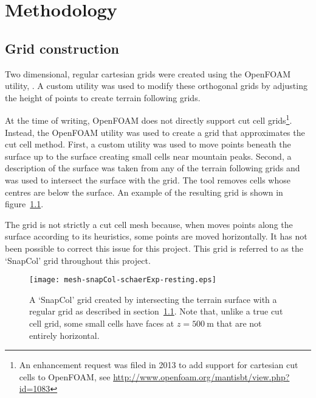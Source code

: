 \chapter{Methodology}

\section{Grid construction}
\label{sec:method:grid}

Two dimensional, regular cartesian grids were created using the OpenFOAM utility, .  A custom utility was used to modify these orthogonal grids by adjusting the height of points to create terrain following grids.

At the time of writing, OpenFOAM does not directly support cut cell grids\footnote{An enhancement request was filed in 2013 to add support for cartesian cut cells to OpenFOAM, see \url{http://www.openfoam.org/mantisbt/view.php?id=1083}}.  Instead, the  OpenFOAM utility was used to create a grid that approximates the cut cell method.  First, a custom utility was used to move points beneath the surface up to the surface creating small cells near mountain peaks.  Second, a description of the surface was taken from any of the terrain following grids and  was used to intersect the surface with the grid.  The tool removes cells whose centres are below the surface.  An example of the resulting grid is shown in figure~\ref{fig:method:cut-cell}.

The grid is not strictly a cut cell mesh because, when  moves points along the surface according to its heuristics, some points are moved horizontally.  It has not been possible to correct this issue for this project.  This grid is referred to as the `SnapCol' grid throughout this project.

\begin{figure}
	\centerfloat
	\texttt{[image: mesh-snapCol-schaerExp-resting.eps]}
	\caption{A `SnapCol' grid created by intersecting the terrain surface with a regular grid as described in section~\ref{sec:method:grid}.  Note that, unlike a true cut cell grid, some small cells have faces at $z = \SI{500}{\meter}$ that are not entirely horizontal.}
	\label{fig:method:cut-cell}
\end{figure}

